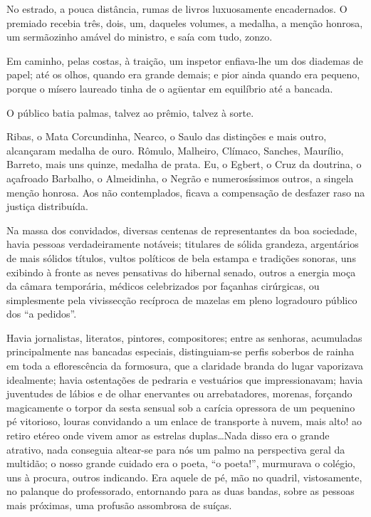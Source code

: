 No estrado, a pouca distância, rumas de livros luxuosamente
encadernados. O premiado recebia três, dois, um, daqueles volumes, a
medalha, a menção honrosa, um sermãozinho amável do ministro, e saía
com tudo, zonzo. 

Em caminho, pelas costas, à traição, um inspetor
enfiava{}-lhe um dos diademas de papel; até os olhos, quando era grande
demais; e pior ainda quando era pequeno, porque o mísero laureado tinha
de o agüentar em equilíbrio até a bancada. 

O público batia palmas, talvez ao prêmio, talvez à sorte. 

Ribas, o Mata Corcundinha, Nearco, o
Saulo das distinções e mais outro, alcançaram medalha de ouro. Rômulo,
Malheiro, Clímaco, Sanches, Maurílio, Barreto, mais uns quinze, medalha
de prata. Eu, o Egbert, o Cruz da doutrina, o açafroado Barbalho, o
Almeidinha, o Negrão e numerosíssimos outros, a singela menção honrosa.
Aos não contemplados, ficava a compensação de desfazer raso na justiça
distribuída. 

Na massa dos convidados, diversas centenas de
representantes da boa sociedade, havia pessoas verdadeiramente
notáveis; titulares de sólida grandeza, argentários de mais sólidos
títulos, vultos políticos de bela estampa e tradições sonoras, uns
exibindo à fronte as neves pensativas do hibernal senado, outros a
energia moça da câmara temporária, médicos celebrizados por façanhas
cirúrgicas, ou simplesmente pela vivissecção recíproca de mazelas em
pleno logradouro público dos ``a pedidos''. 

Havia jornalistas, literatos,
pintores, compositores; entre as senhoras, acumuladas principalmente
nas bancadas especiais, distinguiam{}-se perfis soberbos de rainha em
toda a eflorescência da formosura, que a claridade branda do lugar
vaporizava idealmente; havia ostentações de pedraria e vestuários que
impressionavam; havia juventudes de lábios e de olhar enervantes ou
arrebatadores, morenas, forçando magicamente o torpor da sesta sensual
sob a carícia opressora de um pequenino pé vitorioso, louras convidando
a um enlace de transporte à nuvem, mais alto! ao retiro etéreo onde
vivem amor as estrelas duplas\ldots Nada disso era o grande atrativo, nada
conseguia altear{}-se para nós um palmo na perspectiva geral da
multidão; o nosso grande cuidado era o poeta, ``o poeta!'', murmurava o
colégio, uns à procura, outros indicando. Era aquele de pé, mão no
quadril, vistosamente, no palanque do professorado, entornando para as
duas bandas, sobre as pessoas mais próximas, uma profusão assombrosa de
suíças. 

